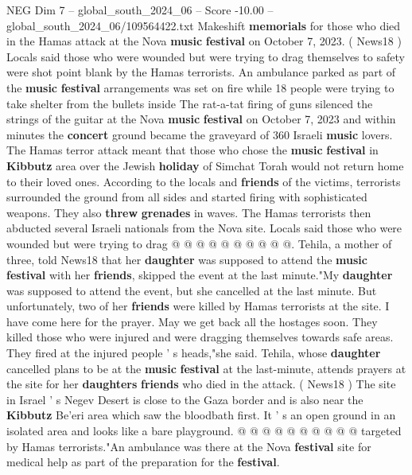 \begin{textsample}{NEG Dim 7 – global\_south\_2024\_06 – Score -10.00 – global\_south\_2024\_06/109564422.txt}  \label{ex:f7_neg_361}
Makeshift \textbf{memorials} for those who died in the Hamas attack at the Nova \textbf{music} \textbf{festival} on October 7, 2023. ( News18 ) Locals said those who were wounded but were trying to drag themselves to safety were shot point blank by the Hamas terrorists.
An ambulance parked as part of the \textbf{music} \textbf{festival} arrangements was set on fire while 18 people were trying to take shelter from the bullets inside The rat-a-tat firing of guns silenced the strings of the guitar at the Nova \textbf{music} \textbf{festival} on October 7, 2023 and within minutes the \textbf{concert} ground became the graveyard of 360 Israeli \textbf{music} lovers.
The Hamas terror attack meant that those who chose the \textbf{music} \textbf{festival} in \textbf{Kibbutz} area over the Jewish \textbf{holiday} of Simchat Torah would not return home to their loved ones.
According to the locals and \textbf{friends} of the victims, terrorists surrounded the ground from all sides and started firing with sophisticated weapons.
They also \textbf{threw} \textbf{grenades} in waves.
The Hamas terrorists then abducted several Israeli nationals from the Nova site.
Locals said those who were wounded but were trying to drag @ @ @ @ @ @ @ @ @ @.
Tehila, a mother of three, told News18 that her \textbf{daughter} was supposed to attend the \textbf{music} \textbf{festival} with her \textbf{friends}, skipped the event at the last minute."My \textbf{daughter} was supposed to attend the event, but she cancelled at the last minute.
But unfortunately, two of her \textbf{friends} were killed by Hamas terrorists at the site.
I have come here for the prayer.
May we get back all the hostages soon.
They killed those who were injured and were dragging themselves towards safe areas.
They fired at the injured people ' s heads,"she said.
Tehila, whose \textbf{daughter} cancelled plans to be at the \textbf{music} \textbf{festival} at the last-minute, attends prayers at the site for her \textbf{daughters} \textbf{friends} who died in the attack. ( News18 ) The site in Israel ' s Negev Desert is close to the Gaza border and is also near the \textbf{Kibbutz} Be'eri area which saw the bloodbath first.
It ' s an open ground in an isolated area and looks like a bare playground. @ @ @ @ @ @ @ @ @ @ targeted by Hamas terrorists."An ambulance was there at the Nova \textbf{festival} site for medical help as part of the preparation for the \textbf{festival}.

\end{textsample}
